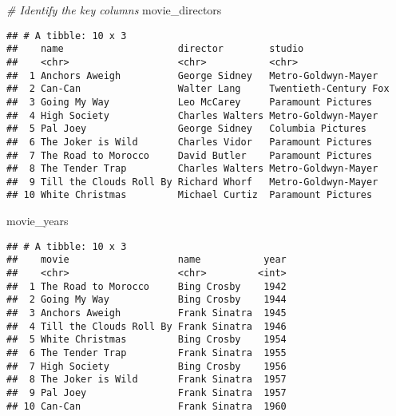 \documentclass[]{article}
\newenvironment{Shaded}{\begin{snugshade}}{\end{snugshade}}
\newcommand{\KeywordTok}[1]{\textcolor[rgb]{0.13,0.29,0.53}{\textbf{#1}}}
\newcommand{\DataTypeTok}[1]{\textcolor[rgb]{0.13,0.29,0.53}{#1}}
\newcommand{\StringTok}[1]{\textcolor[rgb]{0.31,0.60,0.02}{#1}}
\newcommand{\CommentTok}[1]{\textcolor[rgb]{0.56,0.35,0.01}{\textit{#1}}}
\newcommand{\OperatorTok}[1]{\textcolor[rgb]{0.81,0.36,0.00}{\textbf{#1}}}
\newcommand{\NormalTok}[1]{#1}
\begin{document}
\begin{Shaded}
\begin{Highlighting}[]
\CommentTok{# Identify the key columns}
\NormalTok{movie_directors}
\end{Highlighting}
\end{Shaded}

\begin{verbatim}
## # A tibble: 10 x 3
##    name                    director        studio               
##    <chr>                   <chr>           <chr>                
##  1 Anchors Aweigh          George Sidney   Metro-Goldwyn-Mayer  
##  2 Can-Can                 Walter Lang     Twentieth-Century Fox
##  3 Going My Way            Leo McCarey     Paramount Pictures   
##  4 High Society            Charles Walters Metro-Goldwyn-Mayer  
##  5 Pal Joey                George Sidney   Columbia Pictures    
##  6 The Joker is Wild       Charles Vidor   Paramount Pictures   
##  7 The Road to Morocco     David Butler    Paramount Pictures   
##  8 The Tender Trap         Charles Walters Metro-Goldwyn-Mayer  
##  9 Till the Clouds Roll By Richard Whorf   Metro-Goldwyn-Mayer  
## 10 White Christmas         Michael Curtiz  Paramount Pictures
\end{verbatim}

\begin{Shaded}
\begin{Highlighting}[]
\NormalTok{movie_years}
\end{Highlighting}
\end{Shaded}

\begin{verbatim}
## # A tibble: 10 x 3
##    movie                   name           year
##    <chr>                   <chr>         <int>
##  1 The Road to Morocco     Bing Crosby    1942
##  2 Going My Way            Bing Crosby    1944
##  3 Anchors Aweigh          Frank Sinatra  1945
##  4 Till the Clouds Roll By Frank Sinatra  1946
##  5 White Christmas         Bing Crosby    1954
##  6 The Tender Trap         Frank Sinatra  1955
##  7 High Society            Bing Crosby    1956
##  8 The Joker is Wild       Frank Sinatra  1957
##  9 Pal Joey                Frank Sinatra  1957
## 10 Can-Can                 Frank Sinatra  1960
\end{verbatim}

\begin{Shaded}
\end{Shaded}
\end{document}

